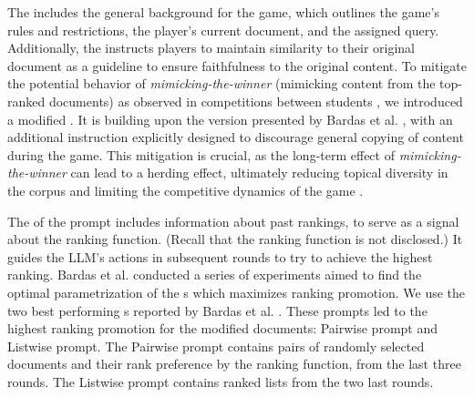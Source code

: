 The \shared{} includes the general background for the game, which outlines the game's rules and restrictions, the player's current document, and the assigned query. Additionally, the \shared{} instructs players to maintain similarity to their original document as a guideline to ensure faithfulness to the original content.
To mitigate the potential behavior of \textit{mimicking-the-winner} (mimicking content from the top-ranked documents) as observed in competitions between students \cite{raifer_information_2017}, we introduced a modified \shared{}. It is building upon the version presented by Bardas et al. \cite{bardas_prompt-based_2025}, with an additional instruction explicitly designed to discourage general copying of content during the game. This mitigation is crucial, as the long-term effect of \textit{mimicking-the-winner} can lead to a herding effect, ultimately reducing topical diversity in the corpus and limiting the competitive dynamics of the game \cite{goren_driving_2021}.

The \contextualized{} of the prompt includes information about past rankings, to serve as a signal about the ranking function. (Recall that the ranking function is not disclosed.) It guides the LLM's actions in subsequent rounds to try to achieve the highest ranking. Bardas et al. \cite{bardas_prompt-based_2025} conducted a series of experiments aimed to find the optimal parametrization of the \contextualized s which maximizes ranking promotion. We use the two best performing \contextualized s reported by Bardas et al. \cite{bardas_prompt-based_2025}. These prompts led to the highest ranking promotion for the modified documents: Pairwise prompt and Listwise prompt. The Pairwise prompt contains pairs of randomly selected documents and their rank preference by the ranking function, from the last three rounds. The Listwise prompt contains ranked lists from the two last rounds.


